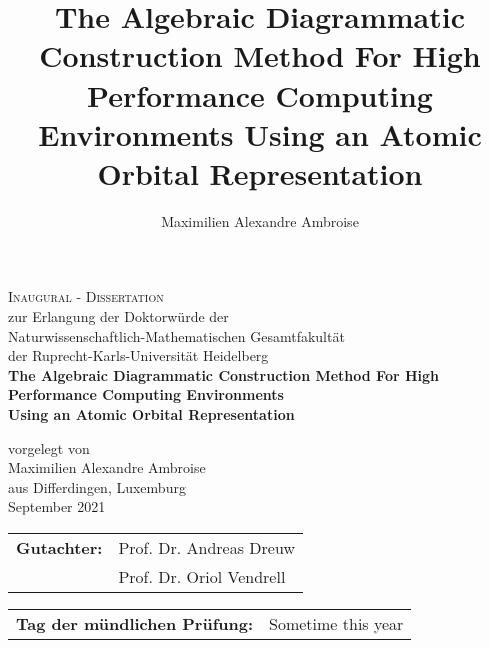 \documentclass[a4paper,12pt]{report}
\begin{document}
\author{Maximilien Alexandre Ambroise}
\title{The Algebraic Diagrammatic Construction Method For High Performance Computing Environments Using an Atomic Orbital Representation}

\begin{titlepage}
\begin{center}
{\Huge\scshape Inaugural - Dissertation \\}
{ zur Erlangung der Doktorwürde der \\
Naturwissenschaftlich-Mathematischen Gesamtfakultät \\
der Ruprecht-Karls-Universität Heidelberg \\}
\vspace{1cm}
{\huge\bfseries The Algebraic Diagrammatic Construction Method For High Performance Computing Environments \\}
{\Large\bfseries Using an Atomic Orbital Representation \\}
 
\vspace{1.5cm}
{vorgelegt von\\}
\vspace*{1.5cm}
{\Large Maximilien Alexandre Ambroise}\\
{\large aus Differdingen, Luxemburg}\\
\vspace{2cm}
{September 2021} \\[5pt]
\vspace{2cm}
\end{center}

\begin{tabular}{ll}
{\bfseries Gutachter:} & Prof. Dr. Andreas Dreuw \\
 & Prof. Dr. Oriol Vendrell
\end{tabular}

\vspace{0.5cm}

\begin{tabular}{ll}
{\bfseries Tag der mündlichen Prüfung:} & {Sometime this year}
\end{tabular}

\end{titlepage}


\newpage

\vspace*{\fill}
\end{document}
